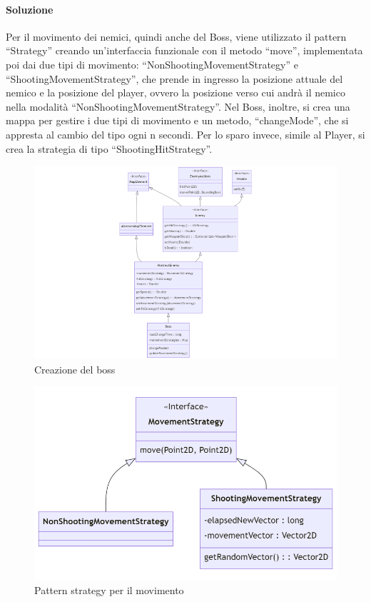 \documentclass[a4paper,12pt]{report}
\begin{document}
\paragraph{Soluzione}
Per il movimento dei nemici, quindi anche del Boss, viene utilizzato il pattern “Strategy” creando un’interfaccia funzionale con il metodo “move”, implementata poi dai due tipi di movimento: “NonShootingMovementStrategy” e “ShootingMovementStrategy”, che prende in ingresso la posizione attuale del nemico e la posizione del player, ovvero la posizione verso cui andrà il nemico nella modalità “NonShootingMovementStrategy”. Nel Boss, inoltre, si crea una mappa per gestire i due tipi di movimento e un metodo, “changeMode”, che si appresta al cambio del tipo ogni n secondi. Per lo sparo invece, simile al Player, si crea la strategia di tipo “ShootingHitStrategy”.
\begin{figure}
    \centering{}
    \includegraphics[scale=0.5]{diagram/boss.png}
    \caption{Creazione del boss}
    \label{img:Boss}
\end{figure}
\begin{figure}
    \centering{}
    \includegraphics[scale=0.5]{diagram/movementStrategy.png}
    \caption{Pattern strategy per il movimento}
    \label{img:movementStrategy}
\end{figure}
\end{document}
